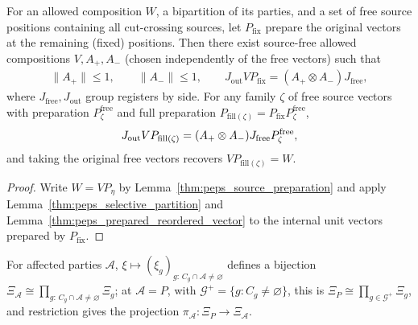 \begin{lemma}
    \label{thm:peps_actual_source_selective_partition}
    \leanok
    For an allowed composition $W$, a bipartition of its parties, and a set of free source positions containing all cut-crossing sources, let $P_{\mathrm{fix}}$ prepare the original vectors at the remaining (fixed) positions. Then there exist source-free allowed compositions $V,A_+,A_-$ (chosen independently of the free vectors) such that
    \begin{align}
        \|A_+\|\leq1,\qquad \|A_-\|\leq1,
        \qquad
        J_{\mathrm{out}}VP_{\mathrm{fix}}
        =(A_+\otimes A_-)J_{\mathrm{free}},
        \label{eq:peps_actual_source_selective_partition}
    \end{align}
    where $J_{\mathrm{free}},J_{\mathrm{out}}$ group registers by side. For any family $\zeta$ of free source vectors with preparation $P_\zeta^{\mathrm{free}}$ and full preparation $P_{\mathrm{fill}(\zeta)}=P_{\mathrm{fix}}P_\zeta^{\mathrm{free}}$,
    \begin{align}
        J_{\mathrm{out}}VP_{\mathrm{fill}(\zeta)}
        =(A_+\otimes A_-)J_{\mathrm{free}}
        P_\zeta^{\mathrm{free}},
        \notag
    \end{align}
    and taking the original free vectors recovers $VP_{\mathrm{fill}(\zeta)}=W$.
\end{lemma}
\begin{proof}
    \leanok
    Write $W=VP_\eta$ by Lemma~\ref{thm:peps_source_preparation} and apply Lemma~\ref{thm:peps_selective_partition} and Lemma~\ref{thm:peps_prepared_reordered_vector} to the internal unit vectors prepared by $P_{\mathrm{fix}}$.
\end{proof}

\begin{definition}
    \label{def:peps_touched_labels}
    \leanok
    For affected parties $\mathcal A$, $\xi\mapsto(\xi_g)_{g:\,C_g\cap\mathcal A\neq\varnothing}$ defines a bijection $\Xi_{\mathcal A}\cong\prod_{g:\,C_g\cap\mathcal A\neq\varnothing}\Xi_g$; at $\mathcal A=P$, with $\mathcal G^+=\{g:C_g\neq\varnothing\}$, this is $\Xi_P\cong\prod_{g\in\mathcal G^+}\Xi_g$, and restriction gives the projection $\pi_{\mathcal A}\colon\Xi_P\to\Xi_{\mathcal A}$.
\end{definition}

